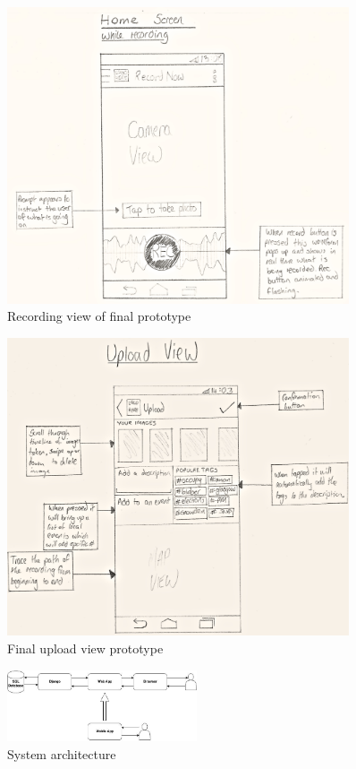 \documentclass{l3proj}
\begin{document}
\newpage
\begin{figure}[ht!]
\centering
\includegraphics[angle=270, width=0.9\textwidth]{images/android-recording-view.jpg}
\caption{Recording view of final prototype}
\end{figure}

\newpage
\begin{figure}[ht!]
\centering
\includegraphics[angle=270, width=0.9\textwidth]{images/android-upload-view.jpg}
\caption{Final upload view prototype}
\end{figure}

\newpage
\begin{figure}[ht!]
\centering
\includegraphics[angle=270, width=0.5\textwidth]{images/project-imp.jpg}
\caption{System architecture}
\end{figure}
\end{document}

